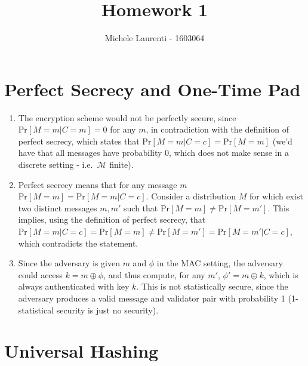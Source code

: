 \documentclass{article}
\title{Homework 1}
\author{Michele Laurenti - 1603064}
\newcommand{\messages}{\mathcal{M}}
\newcommand{\xor}{\oplus}
\renewcommand{\Pr}[1]{\ensuremath{\mathrm{Pr} \left[ {#1} \right]}}
\begin{document}
\maketitle

\section{Perfect Secrecy and One-Time Pad}

\begin{enumerate}
	\item The encryption scheme would not be perfectly secure, since $\Pr{M=m | C=m} = 0$ for any $m$, in contradiction with the definition of perfect secrecy, which states that $\Pr{M=m|C=c}=\Pr{M=m}$ (we'd have that all messages have probability 0, which does not make sense in a discrete setting - i.e.\ $\messages$ finite).

	\item Perfect secrecy means that for any message $m$ $\Pr{M=m} = \Pr{M=m|C=c}$.
		Consider a distribution $M$ for which exist two distinct messages $m, m'$ such that $\Pr{M=m} \neq \Pr{M=m'}$.
		This implies, using the definition of perfect secrecy, that $\Pr{M=m | C=c} = \Pr{M=m} \neq \Pr{M=m'} = \Pr{M=m' | C=c}$, which contradicts the statement.

	\item Since the adversary is given $m$ and $\phi$ in the MAC setting, the adversary could access $k = m \xor \phi$, and thus compute, for any $m'$, $\phi' = m \xor k$, which is always authenticated with key $k$.
		This is not statistically secure, since the adversary produces a valid message and validator pair with probability 1 (1-statistical security is just no security).
\end{enumerate}

\section{Universal Hashing}
\end{document}
